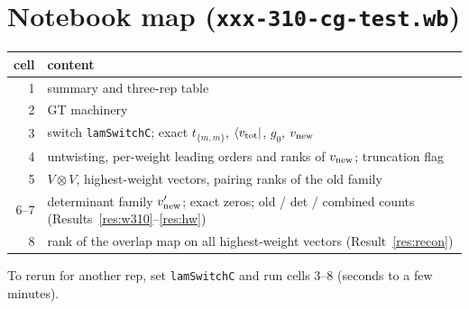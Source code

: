 \documentclass[11pt]{article}
\newcommand{\nb}[1]{\texttt{#1}}
\theoremstyle{definition}
\theoremstyle{remark}
\begin{document}
\section*{Notebook map (\nb{xxx-310-cg-test.wb})}
\begin{center}
\begin{tabular}{rl}\toprule
cell & content\\\midrule
1 & summary and three-rep table\\
2 & GT machinery\\
3 & switch \nb{lamSwitchC}; exact $t_{\{m,m\}}$, $\langle v_{\rm tot}|$, $g_0$, $v_{\rm new}$\\
4 & untwisting, per-weight leading orders and ranks of $v_{\rm new}$; truncation flag\\
5 & $V\otimes V$, highest-weight vectors, pairing ranks of the old family\\
6--7 & determinant family $v'_{\rm new}$; exact zeros; old / det / combined counts (Results~\ref{res:w310}--\ref{res:hw})\\
8 & rank of the overlap map on all highest-weight vectors (Result~\ref{res:recon})\\\bottomrule
\end{tabular}
\end{center}
To rerun for another rep, set \nb{lamSwitchC} and run cells 3--8 (seconds to a few minutes).
\end{document}
